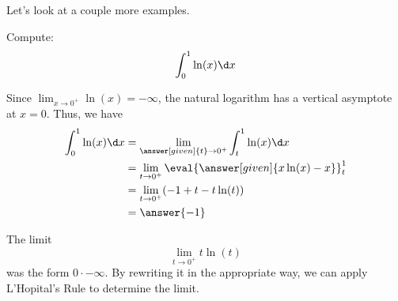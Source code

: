 \documentclass{ximera}
\begin{document}
Let's look at a couple more examples. 


\begin{example}
  Compute:
  \[
  \int_0^1 \ln(x)\d x
  \]
  \begin{explanation}
    Since $\lim_{x\to 0^+} \ln(x) = -\infty$, the natural logarithm
    has a vertical asymptote at $x = 0$. Thus, we have
    \begin{align*}
    \int_0^1 \ln(x) \d x &=\lim_{\answer[given]{t}\to 0^+} \int_t^1 \ln(x) \d x \\
    &= \lim_{t\to 0^+} \eval{\answer[given]{x \ln(x)-x}}_t^1 \\
    &=\lim_{t \to 0^{+}} ( -1 + t - t\ln(t) ) \\
&=\answer{ -1} 
      \end{align*}
\begin{hint}
The limit 
\[
\lim_{t \to 0^{+}} t\ln(t)
\]
was the form $0\cdot -\infty$. By rewriting it in the appropriate way, we can apply L'Hopital's Rule to 
determine the limit. 
\end{hint}
  \end{explanation}
\end{example}
\end{document}
